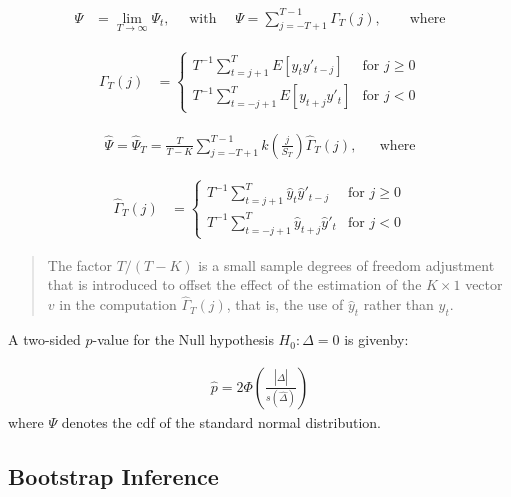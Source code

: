 \documentclass[12pt,oneside,a4paper]{article}
\begin{document}
\begin{align*}
	\Psi &= \lim_{T \to \infty} \Psi_{t},
	\quad \text{ with } \quad
	\Psi = \sum_{j=-T+1}^{T-1} \Gamma_{T}(j),
	\qquad \text{where}
\end{align*}

\begin{align*}
	\Gamma_{T}(j) &=
\begin{cases}
	T^{-1} \sum_{t=j+1}^{T}	E[y_{t}y'_{t-j}] & \text{for } j \geq 0
	\\
	T^{-1} \sum_{t=-j+1}^{T} E[y_{t+j}y'_{t}]& \text{for } j<0
\end{cases}
\end{align*}

\begin{align*}
	\hat{\Psi} = \hat{\Psi}_{T} =
	\frac{T}{T-K}
	\sum_{j=-T+1}^{T-1}
	k\left( \frac{j}{S_{T}} \right) \hat{\Gamma}_{T}(j), && \text{where}
\end{align*}

\begin{align*}
	\hat{\Gamma}_{T}(j) &=
\begin{cases}
	T^{-1} \sum_{t=j+1}^{T}	\hat{y}_{t} \hat{y}'_{t-j} & \text{for } j \geq 0
	\\
	T^{-1} \sum_{t=-j+1}^{T} \hat{y}_{t+j} \hat{y}'_{t}& \text{for } j<0
\end{cases}
\end{align*}

\begin{quote}
{\footnotesize
The factor $T/(T-K)$ is a small sample degrees of freedom adjustment that is introduced to offset the effect of the estimation of the $K \times 1$ vector $v$ in the computation $\hat{\Gamma}_{T}(j)$, that is, the use of $\hat{y}_{t}$ rather than $y_{t}$.}
\end{quote}

A two-sided $p$-value for the Null hypothesis $H_{0}: \Delta=0$ is givenby:

\begin{align*}
	\hat{p} = 2 \Phi\left( \frac{|\hat{\Delta}|}{s(\hat{\Delta})} \right)
\end{align*}
where $\Psi$ denotes the cdf of the standard normal distribution.

\subsection{Bootstrap Inference}
\end{document}
